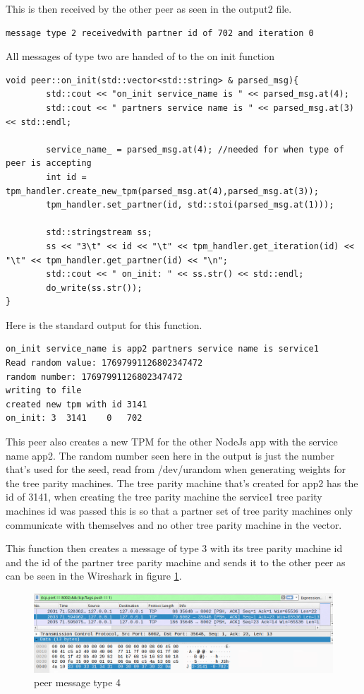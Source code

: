 This is then received by the other peer as seen in the output2 file.
\begin{lstlisting}
message type 2 receivedwith partner id of 702 and iteration 0
\end{lstlisting}
All messages of type two are handed of to the on init function
\begin{lstlisting}
void peer::on_init(std::vector<std::string> & parsed_msg){
		std::cout << "on_init service_name is " << parsed_msg.at(4);
		std::cout << " partners service name is " << parsed_msg.at(3) << std::endl;
		
		service_name_ = parsed_msg.at(4); //needed for when type of peer is accepting
		int id = tpm_handler.create_new_tpm(parsed_msg.at(4),parsed_msg.at(3));
		tpm_handler.set_partner(id, std::stoi(parsed_msg.at(1)));
		
		std::stringstream ss;
		ss << "3\t" << id << "\t" << tpm_handler.get_iteration(id) << "\t" << tpm_handler.get_partner(id) << "\n";
		std::cout << " on_init: " << ss.str() << std::endl;
		do_write(ss.str());
}
\end{lstlisting}
Here is the standard output for this function.
\begin{lstlisting}
on_init service_name is app2 partners service name is service1
Read random value: 17697991126802347472
random number: 17697991126802347472
writing to file
created new tpm with id 3141
on_init: 3	3141	0	702
\end{lstlisting}
This peer also creates a new TPM for the other NodeJs app with the service name app2. The random number seen here in the output is just the number that's used for the seed, read from /dev/urandom when generating weights for the tree parity machines. The tree parity machine that's created for app2 has the id of 3141, when creating the tree parity machine the service1 tree parity machines id was passed this is so that a partner set of tree parity machines only communicate with themselves and no other tree parity machine in the vector. 

This function then creates a message of type 3 with its tree parity machine id and the id of the partner tree parity machine and sends it to the other peer as can be seen in the Wireshark in figure \ref{fig:sync4}.

\begin{figure}[!h]
	\centering
	\includegraphics[width=1\textwidth]{Figures/sync4.png}
	\caption[peer message type 3]{peer message type 4}
	\label{fig:sync4}
\end{figure}
\FloatBarrier

